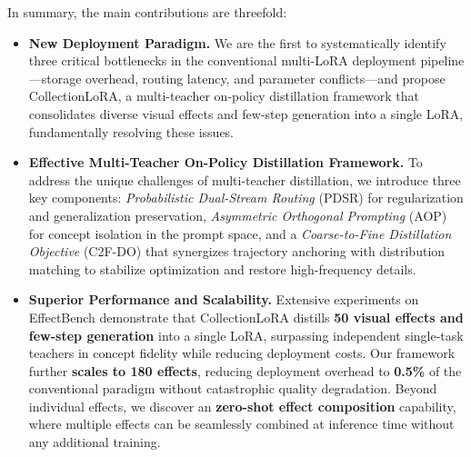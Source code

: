 \documentclass{llmxive}
\begin{document}
In summary, the main contributions are threefold:
\vspace{-0.1cm}
\begin{itemize}
    \item \textbf{New Deployment Paradigm.} We are the first to systematically identify three critical bottlenecks in the conventional multi-LoRA deployment pipeline—storage overhead, routing latency, and parameter conflicts—and propose CollectionLoRA, a multi-teacher on-policy distillation framework that consolidates diverse visual effects and few-step generation into a single LoRA, fundamentally resolving these issues.

    \item \textbf{Effective Multi-Teacher On-Policy Distillation Framework.} To address the 
    unique challenges of multi-teacher distillation, we introduce 
    three key components: \textit{Probabilistic Dual-Stream Routing} (PDSR) for regularization and generalization preservation, \textit{Asymmetric 
    Orthogonal Prompting} (AOP) for concept isolation in the prompt space, and a 
    \textit{Coarse-to-Fine Distillation Objective} (C2F-DO) that synergizes 
    trajectory anchoring with distribution matching to stabilize optimization and restore high-frequency details.
    \item \textbf{Superior Performance and Scalability.} Extensive experiments on EffectBench demonstrate that CollectionLoRA distills \textbf{50 visual effects 
    and few-step generation} into a single LoRA, surpassing independent single-task teachers in concept fidelity while reducing deployment costs. Our framework further \textbf{scales to 180 effects}, reducing deployment overhead to 
    \textbf{0.5\%} of the conventional paradigm without catastrophic quality degradation. Beyond individual effects, we discover an \textbf{zero-shot effect composition} capability, where multiple effects can be seamlessly combined 
    at inference time without any additional training.
\end{itemize}
\end{document}
